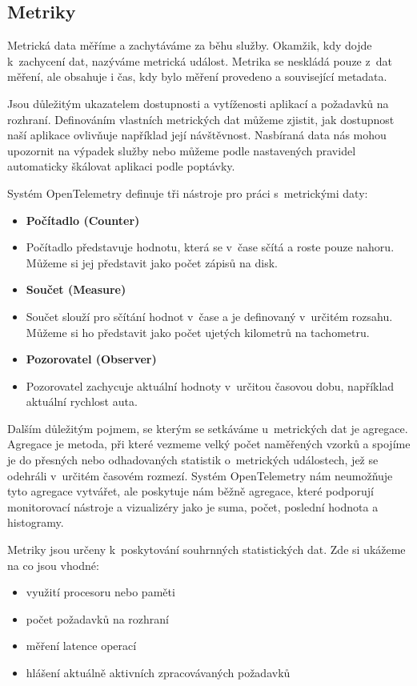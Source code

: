 \subsection{Metriky}
Metrická data \cite{Metrics} měříme a zachytáváme za běhu služby. Okamžik, kdy dojde k~zachycení dat, nazýváme metrická událost. Metrika se neskládá pouze z~dat měření, ale obsahuje i čas, kdy bylo měření provedeno a související metadata.

Jsou důležitým ukazatelem dostupnosti a vytíženosti aplikací a požadavků na rozhraní. Definováním vlastních metrických dat můžeme zjistit, jak dostupnost naší aplikace ovlivňuje například její návštěvnost. Nasbíraná data nás mohou upozornit na výpadek služby nebo můžeme podle nastavených pravidel automaticky škálovat aplikaci podle poptávky.

Systém OpenTelemetry definuje tři nástroje pro práci s~metrickými daty:
    \begin{itemize}
        \item{\textbf{Počítadlo (Counter)}}
        \item[]
        Počítadlo představuje hodnotu, která se v~čase sčítá a roste pouze nahoru. Můžeme si jej představit jako počet zápisů na disk.
        \item{\textbf{Součet (Measure)}}
        \item[]
        Součet slouží pro sčítání hodnot v~čase a je definovaný v~určitém rozsahu. Můžeme si ho představit jako počet ujetých kilometrů na tachometru.
        \item{\textbf{Pozorovatel (Observer)}}
        \item[]
        Pozorovatel zachycuje aktuální hodnoty v~určitou časovou dobu, například aktuální rychlost auta.
    \end{itemize}

    Dalším důležitým pojmem, se kterým se setkáváme u~metrických dat je agregace. Agregace je metoda, při které vezmeme velký počet naměřených vzorků a spojíme je do přesných nebo odhadovaných statistik o~metrických událostech, jež se odehráli v~určitém časovém rozmezí. Systém OpenTelemetry nám neumožňuje tyto agregace vytvářet, ale poskytuje nám běžně agregace, které podporují monitorovací nástroje a vizualizéry jako je suma, počet, poslední hodnota a histogramy.

    Metriky jsou určeny k~poskytování souhrnných statistických dat. Zde si ukážeme na co jsou vhodné:
    \begin{itemize}
        \item{využití procesoru nebo paměti}
        \item{počet požadavků na rozhraní}
        \item{měření latence operací}
        \item{hlášení aktuálně aktivních zpracovávaných požadavků}
    \end{itemize}
